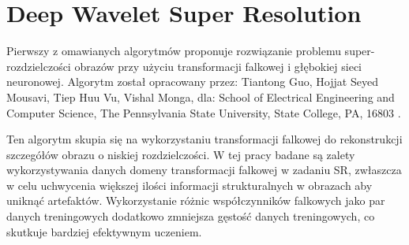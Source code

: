 \chapter{Deep Wavelet Super Resolution}


Pierwszy z omawianych algorytmów proponuje rozwiązanie problemu super-rozdzielczości obrazów przy użyciu transformacji falkowej i głębokiej sieci neuronowej. Algorytm został opracowany przez: Tiantong Guo, Hojjat Seyed Mousavi, Tiep Huu Vu, Vishal Monga, dla: School of Electrical Engineering and Computer Science, The Pennsylvania State University, State College, PA, 16803 \cite{guo2017deep}.

Ten algorytm skupia się na wykorzystaniu transformacji falkowej do rekonstrukcji szczegółów obrazu o niskiej rozdzielczości.
W tej pracy badane są zalety wykorzystywania danych domeny transformacji falkowej w zadaniu SR, zwłaszcza w celu uchwycenia większej ilości informacji strukturalnych w obrazach aby uniknąć artefaktów. Wykorzystanie różnic współczynników falkowych jako par danych treningowych dodatkowo zmniejsza gęstość danych treningowych, co skutkuje bardziej efektywnym uczeniem. 

